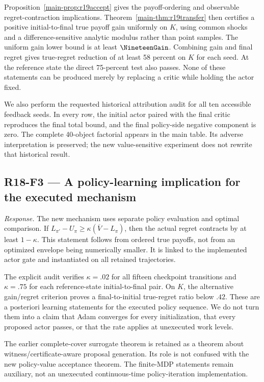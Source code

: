 Proposition~\ref{main-prop:r19accept} gives the payoff-ordering and observable regret-contraction implications. Theorem~\ref{main-thm:r19transfer} then certifies a positive initial-to-final true payoff gain uniformly on $K$, using common shocks and a difference-sensitive analytic modulus rather than point samples. The uniform gain lower bound is at least $\NineteenGain$. Combining gain and final regret gives true-regret reduction of at least 58 percent on $K$ for each seed. At the reference state the direct 75-percent test also passes. None of these statements can be produced merely by replacing a critic while holding the actor fixed.

We also perform the requested historical attribution audit for all ten accessible feedback seeds. In every row, the initial actor paired with the final critic reproduces the final total bound, and the final policy-side negative component is zero. The complete 40-object factorial appears in the main table. Its adverse interpretation is preserved; the new value-sensitive experiment does not rewrite that historical result.

\subsection{R18-F3 --- A policy-learning implication for the executed mechanism}
\emph{Response.} The new mechanism uses separate policy evaluation and optimal comparison. If $L_{\pi'}-U_\pi\geq\kappa(\overline V-L_\pi)$, then the actual regret contracts by at least $1-\kappa$. This statement follows from ordered true payoffs, not from an optimized envelope being numerically smaller. It is linked to the implemented actor gate and instantiated on all retained trajectories.

The explicit audit verifies $\kappa=.02$ for all fifteen checkpoint transitions and $\kappa=.75$ for each reference-state initial-to-final pair. On $K$, the alternative gain/regret criterion proves a final-to-initial true-regret ratio below $.42$. These are a posteriori learning statements for the executed policy sequence. We do not turn them into a claim that Adam converges for every initialization, that every proposed actor passes, or that the rate applies at unexecuted work levels.

The earlier complete-cover surrogate theorem is retained as a theorem about witness/certificate-aware proposal generation. Its role is not confused with the new policy-value acceptance theorem. The finite-MDP statements remain auxiliary, not an unexecuted continuous-time policy-iteration implementation.

